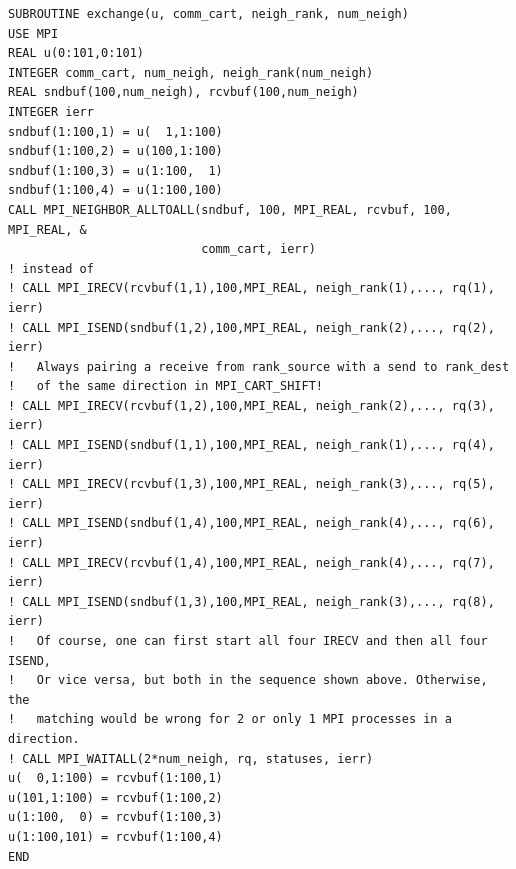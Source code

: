 \begin{example}
\begin{lstlisting}[language={[MPI]Fortran},basicstyle=\lstsmall,caption={Communication routine with local data copying and sparse neighborhood alltoall}]
SUBROUTINE exchange(u, comm_cart, neigh_rank, num_neigh)
USE MPI
REAL u(0:101,0:101)
INTEGER comm_cart, num_neigh, neigh_rank(num_neigh)
REAL sndbuf(100,num_neigh), rcvbuf(100,num_neigh)
INTEGER ierr
sndbuf(1:100,1) = u(  1,1:100)
sndbuf(1:100,2) = u(100,1:100)
sndbuf(1:100,3) = u(1:100,  1)
sndbuf(1:100,4) = u(1:100,100)
CALL MPI_NEIGHBOR_ALLTOALL(sndbuf, 100, MPI_REAL, rcvbuf, 100, MPI_REAL, &
                           comm_cart, ierr)
! instead of
! CALL MPI_IRECV(rcvbuf(1,1),100,MPI_REAL, neigh_rank(1),..., rq(1), ierr)
! CALL MPI_ISEND(sndbuf(1,2),100,MPI_REAL, neigh_rank(2),..., rq(2), ierr)
!   Always pairing a receive from rank_source with a send to rank_dest
!   of the same direction in MPI_CART_SHIFT!
! CALL MPI_IRECV(rcvbuf(1,2),100,MPI_REAL, neigh_rank(2),..., rq(3), ierr)
! CALL MPI_ISEND(sndbuf(1,1),100,MPI_REAL, neigh_rank(1),..., rq(4), ierr)
! CALL MPI_IRECV(rcvbuf(1,3),100,MPI_REAL, neigh_rank(3),..., rq(5), ierr)
! CALL MPI_ISEND(sndbuf(1,4),100,MPI_REAL, neigh_rank(4),..., rq(6), ierr)
! CALL MPI_IRECV(rcvbuf(1,4),100,MPI_REAL, neigh_rank(4),..., rq(7), ierr)
! CALL MPI_ISEND(sndbuf(1,3),100,MPI_REAL, neigh_rank(3),..., rq(8), ierr)
!   Of course, one can first start all four IRECV and then all four ISEND,
!   Or vice versa, but both in the sequence shown above. Otherwise, the
!   matching would be wrong for 2 or only 1 MPI processes in a direction.
! CALL MPI_WAITALL(2*num_neigh, rq, statuses, ierr)
u(  0,1:100) = rcvbuf(1:100,1)
u(101,1:100) = rcvbuf(1:100,2)
u(1:100,  0) = rcvbuf(1:100,3)
u(1:100,101) = rcvbuf(1:100,4)
END
\end{lstlisting}



\end{example}
